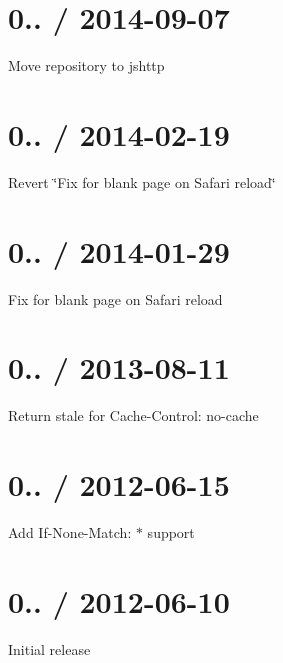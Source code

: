 \section*{0.. / 2014-\/09-\/07 }


\begin{DoxyItemize}
\item Move repository to jshttp
\end{DoxyItemize}

\section*{0.. / 2014-\/02-\/19 }


\begin{DoxyItemize}
\item Revert \char`\"{}\+Fix for blank page on Safari reload\char`\"{}
\end{DoxyItemize}

\section*{0.. / 2014-\/01-\/29 }


\begin{DoxyItemize}
\item Fix for blank page on Safari reload
\end{DoxyItemize}

\section*{0.. / 2013-\/08-\/11 }


\begin{DoxyItemize}
\item Return stale for {\ttfamily Cache-\/\+Control\+: no-\/cache}
\end{DoxyItemize}

\section*{0.. / 2012-\/06-\/15 }


\begin{DoxyItemize}
\item Add {\ttfamily If-\/\+None-\/\+Match\+: $\ast$} support
\end{DoxyItemize}

\section*{0.. / 2012-\/06-\/10 }


\begin{DoxyItemize}
\item Initial release 
\end{DoxyItemize}